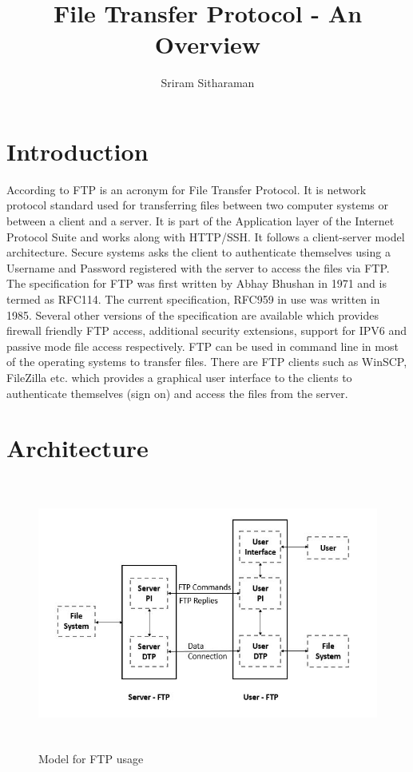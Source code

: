 \documentclass[9pt,twocolumn,twoside]{styles/osajnl}
\title{File Transfer Protocol - An Overview}
\author[1,*]{Sriram Sitharaman}
\affil[1]{School of Informatics and Computing, Bloomington, IN 47408, U.S.A.}
\affil[*]{Corresponding authors: srirsith@iu.edu}
\begin{document}
\maketitle
\tableofcontents %
\section{Introduction}
According to \cite{www-wiki-ftp} FTP is an acronym for File Transfer Protocol. It is network protocol standard used for transferring files between two computer systems or between a client and a server. It is part of the Application layer of the Internet Protocol Suite and works along with HTTP/SSH. It follows a client-server model architecture. Secure systems asks the client to authenticate themselves using a Username and Password registered with the server to access the files via FTP. The specification for FTP was first written by  Abhay Bhushan \cite{www-rfc114} in 1971 and is termed as RFC114. The current specification, RFC959 in use was written in 1985. Several other versions of the specification are available which provides firewall friendly FTP access, additional security extensions, support for IPV6 and passive mode file access respectively. FTP can be used in command line in most of the operating systems to transfer files. There are FTP clients such as WinSCP, FileZilla etc. which provides a graphical user interface to the clients to authenticate themselves (sign on) and access the files from the server.


\section{Architecture}

\begin{figure}[hbt]
\begin{center}
\centering
\includegraphics[width =6in ,height=3.5in]{images/Architecture}
\caption{Model for FTP usage \cite{www-rfc959}}
\end{center}
\end{figure}
\end{document}

